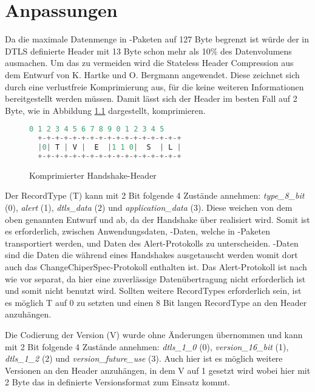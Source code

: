 \chapter{Anpassungen}

Da die maximale Datenmenge in -Paketen auf 127 Byte begrenzt ist würde der in DTLS definierte Header mit 13 Byte schon mehr als 10\% des
Datenvolumens ausmachen. Um das zu vermeiden wird die Stateless Header Compression aus dem Entwurf von K. Hartke und O. Bergmann \cite{draftcodtls}
angewendet. Diese zeichnet sich durch eine verlustfreie Komprimierung aus, für die keine weiteren Informationen bereitgestellt werden müssen. Damit
lässt sich der Header im besten Fall auf 2 Byte, wie in Abbildung \ref{fig:com_handshake_header} dargestellt, komprimieren.

\begin{figure}[ht]
  \centering
  \begin{lstlisting}[language=c]
   0 1 2 3 4 5 6 7 8 9 0 1 2 3 4 5
  +-+-+-+-+-+-+-+-+-+-+-+-+-+-+-+-+
  |0| T | V |  E  |1 1 0|  S  | L |
  +-+-+-+-+-+-+-+-+-+-+-+-+-+-+-+-+
  \end{lstlisting}
  \caption{Komprimierter Handshake-Header}
  \label{fig:com_handshake_header}
\end{figure}

Der RecordType (T) kann mit 2 Bit folgende 4 Zustände annehmen: \textit{type\_8\_bit} (0), \textit{alert} (1), \textit{dtls\_data} (2) und \textit{application\_data} (3).
Diese weichen von dem oben genannten Entwurf und  ab, da der Handshake über  realisiert wird. Somit ist es erforderlich, zwischen
Anwendungsdaten, -Daten, welche in -Paketen transportiert werden, und Daten des Alert-Protokolls zu unterscheiden. -Daten sind die
Daten die während eines Handshakes ausgetauscht werden womit dort auch das ChangeChiperSpec-Protokoll enthalten ist. Das Alert-Protokoll ist nach wie vor separat,
da hier eine zuverlässige Datenübertragung nicht erforderlich ist und  somit nicht benutzt wird. Sollten weitere RecordTypes erforderlich sein, ist es möglich
T auf 0 zu setzten und einen 8 Bit langen RecordType an den Header anzuhängen.

Die Codierung der Version (V) wurde ohne Änderungen übernommen und kann mit 2 Bit folgende 4 Zustände annehmen: \textit{dtls\_1\_0} (0), \textit{version\_16\_bit} (1),
\textit{dtls\_1\_2} (2) und \textit{version\_future\_use} (3). Auch hier ist es möglich weitere Versionen an den Header anzuhängen, in dem V auf 1 gesetzt wird wobei
hier mit 2 Byte das in  definierte Versionsformat zum Einsatz kommt.

